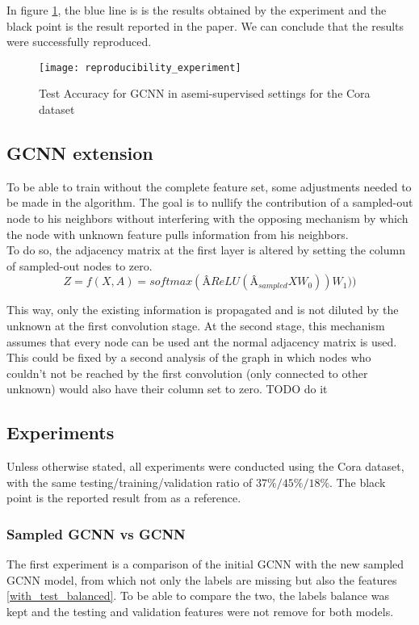 \documentclass{article}
\begin{document}
In figure \ref{repro}, the blue line is is the results obtained by the experiment and the black point is the result reported in the paper. We can conclude that the results were successfully reproduced.

\begin{figure}[h]
\centering
\texttt{[image: reproducibility\_experiment]}
\caption{Test Accuracy for GCNN in asemi-supervised settings for the Cora dataset}
\label{repro}
\end{figure}
\subsection*{GCNN extension}
To be able to train without the complete feature set, some adjustments needed to be made in the algorithm. The goal is to nullify the contribution of a sampled-out node to his neighbors without interfering with the opposing mechanism by which the node with unknown feature pulls information from his neighbors.
\\
To do so, the adjacency matrix at the first layer is altered by setting the column of sampled-out nodes to zero.
\begin{equation}
Z = f(X, A) = softmax(\text{\^{A}} ReLU(\text{\^{A}}_{sampled}XW_0))W_1))
\end{equation}

This way, only the existing information is propagated and is not diluted by the unknown at the first convolution stage. At the second stage, this mechanism assumes that every node can be used ant the normal adjacency matrix is used. 
\\This could be fixed by a second analysis of the graph in which nodes who couldn't not be reached by the first convolution (only connected to other unknown) would also have their column set to zero.
TODO do it
\subsection*{Experiments}
Unless otherwise stated, all experiments were conducted using the Cora dataset, with the same testing/training/validation ratio of $37\%/45\%/18\%$. The black point is the reported result from \citeauthor{kipf2017semi} as a reference.
\subsubsection*{Sampled GCNN vs GCNN}
The first experiment is a comparison of the initial GCNN with the new sampled GCNN model, from which not only the labels are missing but also the features \ref{with_test_balanced}. To be able to compare the two, the labels balance was kept and the testing and validation features were not remove for both models. 
\end{document}
